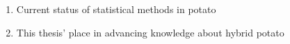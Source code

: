 \documentclass[
]{article}
\providecommand{\tightlist}{%
  \setlength{\itemsep}{0pt}\setlength{\parskip}{0pt}}\usepackage{longtable,booktabs,array}
\begin{document}
\begin{enumerate}
  \begin{enumerate}
  \def\labelenumii{\roman{enumii})}
  \tightlist
  \item
    Current status of statistical methods in potato
  \item
    This thesis' place in advancing knowledge about hybrid potato
  \end{enumerate}
\end{enumerate}


\printbibliography
\end{document}
